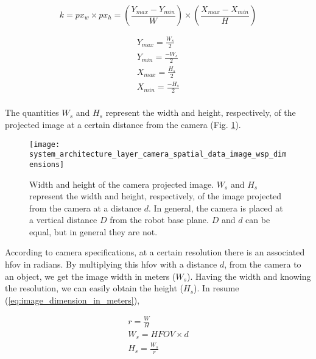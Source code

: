 \begin{equation}
k = px_w \times px_h = (\frac{Y_{max} - Y_{min}}{W}) \times (\frac{X_{max} - X_{min}}{H})
\label{eq:px_to_meter_conversion}
\end{equation}

\begin{equation}
\label{eq:workspace_limits}
    \left.
    \begin{aligned}
        Y_{max} = \frac{W_s}{2} \\
        Y_{min} = \frac{-W_s}{2} \\
        X_{max} = \frac{H_s}{2} \\
        X_{min} = \frac{-H_s}{2} \\
    \end{aligned}
    \right.
\end{equation}

The quantities $W_s$ and $H_s$ represent the width and height, respectively, of the projected image at a certain distance from the camera (Fig. \ref{fig:system_architecture_layer_camera_spatial_data_image_wsp_dimensions}).

\begin{figure}[htbp]
	\centering
	\texttt{[image: system\_architecture\_layer\_camera\_spatial\_data\_image\_wsp\_dimensions]}
	\caption[Width and height of the camera projected image.]{Width and height of the camera projected image. $W_s$ and $H_s$ represent the width and height, respectively, of the image projected from the camera at a distance $d$. In general, the camera is placed at a vertical distance $D$ from the robot base plane. $D$ and $d$ can be equal, but in general they are not.} 
	\label{fig:system_architecture_layer_camera_spatial_data_image_wsp_dimensions}
\end{figure}

According to camera specifications, at a certain resolution there is an associated \gls{hfov} in radians. By multiplying this \gls{hfov} with a distance $d$, from the camera to an object, we get the image width in meters ($W_s$). Having the width and knowing the resolution, we can easily obtain the height ($H_s$). In resume (\ref{eq:image_dimension_in_meters}),

\begin{equation}
\label{eq:image_dimension_in_meters}
    \left.
    \begin{aligned}
        r = \frac{W}{H} \\
        W_s = HFOV \times d \\
        H_s = \frac{W_s}{r} \\
    \end{aligned}
    \right.
\end{equation}

